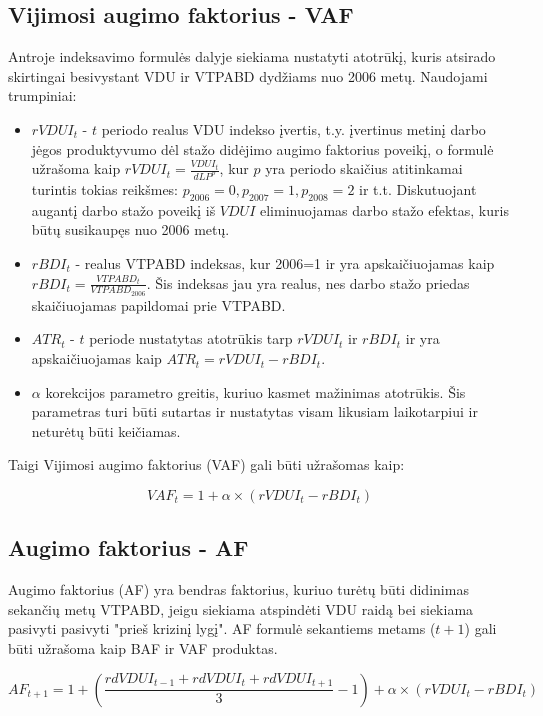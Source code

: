 \documentclass[titlepage, 11pt]{article}
\begin{document}
\newpage

\subsection{Vijimosi augimo faktorius - VAF}
Antroje indeksavimo formulės dalyje siekiama nustatyti atotrūkį, kuris atsirado skirtingai besivystant VDU ir VTPABD dydžiams nuo 2006 metų.
Naudojami trumpiniai:

\begin{itemize}
\item $rVDUI_{t}$ - $t$ periodo realus VDU indekso įvertis, t.y. įvertinus metinį darbo jėgos produktyvumo dėl stažo didėjimo augimo faktorius poveikį, o  formulė užrašoma kaip $rVDUI_{t}=\frac{VDUI_{t}}{dLP^p}$, kur $p$ yra periodo skaičius atitinkamai turintis tokias reikšmes: $p_{2006}=0,p_{2007}=1,p_{2008}=2$ ir t.t. Diskutuojant augantį darbo stažo poveikį iš $VDUI$ eliminuojamas darbo stažo efektas, kuris būtų susikaupęs nuo 2006 metų.
\item $rBDI_{t}$ - realus VTPABD indeksas, kur 2006=1 ir yra apskaičiuojamas kaip $rBDI_{t}=\frac{VTPABD_{t}}{VTPABD_{2006}}$. Šis indeksas jau yra realus, nes darbo stažo priedas skaičiuojamas papildomai prie VTPABD.
\item $ATR_{t}$ - $t$ periode nustatytas atotrūkis  tarp $rVDUI_{t}$ ir $rBDI_{t}$ ir yra apskaičiuojamas kaip $ATR_{t}=rVDUI_{t}-rBDI_{t}$. 
\item $\alpha$ korekcijos parametro greitis, kuriuo kasmet mažinimas atotrūkis. Šis parametras turi būti sutartas ir nustatytas visam likusiam laikotarpiui ir neturėtų būti keičiamas.
\end{itemize}

Taigi Vijimosi augimo faktorius (VAF) gali būti užrašomas kaip:

\begin{equation}
VAF_{t}= 1+ \alpha \times	(rVDUI_{t}-rBDI_{t})
\end{equation}

\subsection{Augimo faktorius - AF}
Augimo faktorius (AF) yra bendras faktorius, kuriuo turėtų būti didinimas sekančių metų VTPABD, jeigu siekiama atspindėti VDU raidą bei siekiama pasivyti pasivyti "prieš krizinį lygį". AF formulė sekantiems metams ($t+1$) gali būti užrašoma kaip BAF ir VAF produktas.

\begin{equation}
AF_{t+1}=1+(\frac{rdVDUI_{t-1}+rdVDUI_{t}+rdVDUI_{t+1}}{3}-1) + \alpha \times	(rVDUI_{t}-rBDI_{t})
\end{equation}
\end{document}
